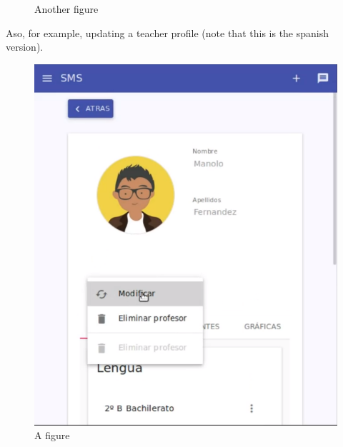 \begin{figure}[H]
\begin{minipage}{.5\textwidth}
  \caption{Another figure}
\end{minipage}
\end{figure}

\noindent Aso, for example, updating a teacher profile (note that this is
the spanish version).

\begin{figure}[H]
\centering
\begin{minipage}{.5\textwidth}
  \centering
  \includegraphics[scale=0.3]{img/snaps/teacher_profile_update.png}
  \caption{A figure}
\end{minipage}%
\begin{minipage}{.5\textwidth}
  \centering

\end{minipage}
\end{figure}

